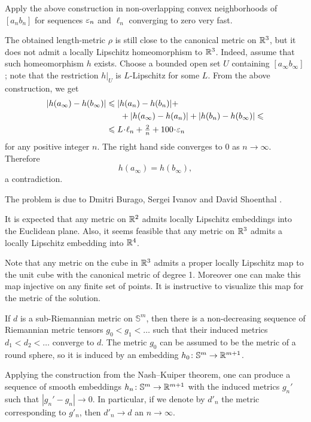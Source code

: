 Apply the above construction in non-overlapping convex neighborhoods of $[a_nb_n]$ 
for sequences 
$\varepsilon_n$ and $\ell_n$ 
converging to zero very fast.

The obtained length-metric $\rho$ is still close to the canonical metric on $\mathbb{R}^3$,
but it does not admit 
a locally Lipschitz homeomorphism to $\mathbb{R}^3$.
Indeed, 
assume that such homeomorphism $h$ exists.
Choose a bounded open set $U$ containing $[a_\infty b_\infty]$;
note that the restriction $h|_U$ is $L$-Lipschitz for some $L$.
From the above construction,
we get 
\begin{align*}
|h(a_\infty)-h(b_\infty)|
&\le 
|h(a_n)-h(b_n)|
+
\\
&\ \ \ \ \ +
|h(a_\infty)-h(a_n)|
+
|h(b_n)-h(b_\infty)|
\le
\\
&\le
L\cdot\ell_n+\tfrac2n+100\cdot\eps_n
\end{align*}
for any positive integer $n$.
The right hand side converges to $0$ as $n\to\infty$.
Therefore 
\[h(a_\infty)=h(b_\infty),\] 
a contradiction.\qeds



The problem is due to
Dmitri Burago, 
Sergei Ivanov 
and David Shoenthal \cite{BIS}.

It is expected that any metric on $\mathbb{R}^2$ admits locally Lipschitz embeddings into the Euclidean plane.
Also, it seems feasible that any metric on $\mathbb{R}^3$ admits a locally Lipschitz embedding into $\mathbb{R}^4$.

Note that any metric on the cube in $\mathbb{R}^3$ admits a proper locally Lipschitz map to the unit cube with the canonical metric of degree 1.
Moreover one can make this map injective on any finite set of points.
It is instructive to visualize this map for the metric of the solution.

If $d$ is a sub-Riemannian metric on $\mathbb{S}^m$,
then there is a non-decreasing sequence of Riemannian metric tensors
$g_0< g_1<\dots$ such that their induced metrics $d_1<d_2<\dots$ converge to $d$.
The metric $g_0$ can be assumed to be the metric of a round sphere,
so it is induced by an embedding $h_0\colon\mathbb{S}^m\to \mathbb{R}^{m+1}$.

Applying the construction from the Nash--Kuiper theorem,
one can produce a sequence of smooth embeddings $h_n\colon\mathbb{S}^m\to \mathbb{R}^{m+1}$ with the induced metrics $g_n'$
such that $|g_n'-g_n|\to 0$.
In particular, if we denote by $d'_n$ the metric corresponding to $g'_n$, then $d'_n\to d$ an $n\to\infty$.

